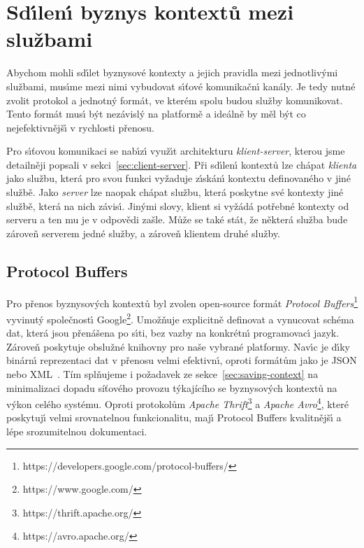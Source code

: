 \section{Sd\'{\i}len\'{\i} byznys kontextů mezi službami}

Abychom mohli sd\'{\i}let byznysové kontexty a jejich pravidla
mezi jednotliv\'ymi službami, mus\'{\i}me mezi nimi vybudovat
s\'{\i}ťové komunikačn\'{\i} kanály. Je tedy nutné zvolit protokol
a jednotn\'y formát, ve kterém spolu budou služby komunikovat.
Tento formát mus\'{\i} b\'yt nezávisl\'y na platformě a ideálně
by měl b\'yt co nejefektivnějš\'{\i} v rychlosti přenosu.

Pro s\'{\i}ťovou komunikaci se nab\'{\i}z\'{\i} využ\'{\i}t architekturu
\textit{klient-server}, kterou jsme detailněji popsali
v sekci~\ref{sec:client-server}. Při sd\'{\i}len\'{\i} kontextů
lze chápat \textit{klienta} jako službu, která pro svou funkci
vyžaduje z\'{\i}skán\'{\i} kontextu definovaného v jiné službě.
Jako \textit{server} lze naopak chápat službu, která poskytne
své kontexty jiné službě, která na nich závis\'{\i}. Jin\'ymi slovy,
klient si vyžádá potřebné kontexty od serveru a ten mu je v
odpovědi zašle. Může se také stát, že některá služba bude zároveň
serverem jedné služby, a zároveň klientem druhé služby.

\subsection{Protocol Buffers}

Pro přenos byznysov\'ych kontextů byl zvolen open-source formát
\textit{Protocol Buffers}\footnote{https://developers.google.com/protocol-buffers/}\cite{varda2008protocol}
vyvinut\'y společnost\'{\i} Google\footnote{https://www.google.com/}.
Umožňuje explicitně definovat a vynucovat schéma dat,
která jsou přenášena po s\'{\i}ti, bez vazby na konkrétn\'{\i} programovac\'{\i}
jazyk. Zároveň poskytuje obslužné knihovny pro naše vybrané platformy.
Nav\'{\i}c je d\'{\i}ky binárn\'{\i} reprezentaci dat v přenosu velmi efektivn\'{\i},
oproti formátům jako je \gls{JSON} nebo \gls{XML}~\cite{maeda2012performance}.
Tím splňujeme i požadavek ze sekce~\ref{sec:saving-context} na minimalizaci dopadu
síťového provozu týkajícího se byznysových kontextů na výkon celého systému.
Oproti protokolům \textit{Apache Thrift}\footnote{https://thrift.apache.org/}
a \textit{Apache Avro}\footnote{https://avro.apache.org/}, které poskytuj\'{\i}
velmi srovnatelnou funkcionalitu, maj\'{\i} Protocol Buffers
kvalitnějš\'{\i} a lépe srozumitelnou dokumentaci.

